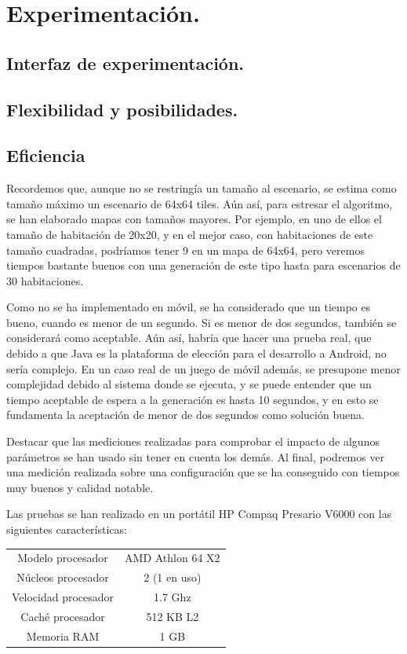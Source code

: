 \chapter{Experimentación.}\label{cap:capitulo7}


\section{Interfaz de experimentación.}


\section{Flexibilidad y posibilidades.}


\section{Eficiencia}

Recordemos que, aunque no se restringía un tamaño al escenario, se estima como tamaño máximo un escenario de 64x64 tiles. Aún así, para estresar el algoritmo, se han elaborado mapas con tamaños mayores. Por ejemplo, en uno de ellos el tamaño de habitación de 20x20, y en el mejor caso, con habitaciones de este tamaño cuadradas, podríamos tener 9 en un mapa de 64x64, pero veremos tiempos bastante buenos con una generación de este tipo hasta para escenarios de 30 habitaciones.

Como no se ha implementado en móvil, se ha considerado que un tiempo es bueno, cuando es menor de un segundo. Si es menor de dos segundos, también se considerará como aceptable. Aún así, habría que hacer una prueba real, que debido a que Java es la plataforma de elección para el desarrollo a Android, no sería complejo. En un caso real de un juego de móvil además, se presupone menor complejidad debido al sistema donde se ejecuta, y se puede entender que un tiempo aceptable de espera a la generación es hasta 10 segundos, y en esto se fundamenta la aceptación de menor de dos segundos como solución buena.

Destacar que las mediciones realizadas para comprobar el impacto de algunos parámetros se han usado sin tener en cuenta los demás. Al final, podremos ver una medición realizada sobre una configuración que se ha conseguido con tiempos muy buenos y calidad notable.

Las pruebas se han realizado en un portátil HP Compaq Presario V6000 con las siguientes características:

\begin{center}
	\begin{tabular}{ | c | c | }
\hline
Modelo procesador & AMD Athlon 64 X2 \\ 
Núcleos procesador & 2 (1 en uso) \\
Velocidad procesador & 1.7 Ghz \\
Caché procesador & 512 KB L2 \\
Memoria RAM & 1 GB \\
\hline
	\end{tabular}
\end{center}


